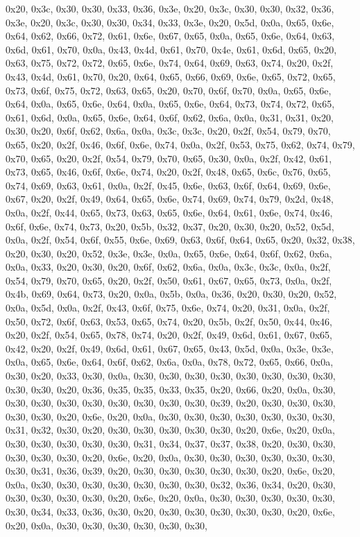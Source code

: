\documentclass[
]{book}
\begin{document}
0x20, 0x3c, 0x30, 0x30, 0x33, 0x36, 0x3e, 0x20, 0x3c, 0x30, 0x30, 0x32, 0x36, 0x3e, 0x20, 0x3c, 0x30, 0x30, 0x34, 0x33, 0x3e, 0x20, 0x5d, 0x0a, 0x65, 0x6e, 0x64, 0x62, 0x66, 0x72, 0x61, 0x6e, 0x67, 0x65, 0x0a, 0x65, 0x6e, 0x64, 0x63, 0x6d, 0x61, 0x70, 0x0a, 0x43, 0x4d, 0x61, 0x70, 0x4e, 0x61, 0x6d, 0x65, 0x20, 0x63, 0x75, 0x72, 0x72, 0x65, 0x6e, 0x74, 0x64, 0x69, 0x63, 0x74, 0x20, 0x2f, 0x43, 0x4d, 0x61, 0x70, 0x20, 0x64, 0x65, 0x66, 0x69, 0x6e, 0x65, 0x72, 0x65, 0x73, 0x6f, 0x75, 0x72, 0x63, 0x65,
0x20, 0x70, 0x6f, 0x70, 0x0a, 0x65, 0x6e, 0x64, 0x0a, 0x65, 0x6e, 0x64, 0x0a, 0x65, 0x6e, 0x64, 0x73, 0x74, 0x72, 0x65, 0x61, 0x6d, 0x0a, 0x65, 0x6e, 0x64, 0x6f, 0x62, 0x6a, 0x0a, 0x31, 0x31, 0x20, 0x30, 0x20, 0x6f, 0x62, 0x6a, 0x0a, 0x3c, 0x3c, 0x20, 0x2f, 0x54, 0x79, 0x70, 0x65, 0x20, 0x2f, 0x46, 0x6f, 0x6e, 0x74, 0x0a, 0x2f, 0x53, 0x75, 0x62, 0x74, 0x79, 0x70, 0x65, 0x20, 0x2f, 0x54, 0x79, 0x70, 0x65, 0x30, 0x0a, 0x2f, 0x42, 0x61, 0x73, 0x65, 0x46, 0x6f, 0x6e, 0x74, 0x20, 0x2f, 0x48, 0x65, 0x6c,
0x76, 0x65, 0x74, 0x69, 0x63, 0x61, 0x0a, 0x2f, 0x45, 0x6e, 0x63, 0x6f, 0x64, 0x69, 0x6e, 0x67, 0x20, 0x2f, 0x49, 0x64, 0x65, 0x6e, 0x74, 0x69, 0x74, 0x79, 0x2d, 0x48, 0x0a, 0x2f, 0x44, 0x65, 0x73, 0x63, 0x65, 0x6e, 0x64, 0x61, 0x6e, 0x74, 0x46, 0x6f, 0x6e, 0x74, 0x73, 0x20, 0x5b, 0x32, 0x37, 0x20, 0x30, 0x20, 0x52, 0x5d, 0x0a, 0x2f, 0x54, 0x6f, 0x55, 0x6e, 0x69, 0x63, 0x6f, 0x64, 0x65, 0x20, 0x32, 0x38, 0x20, 0x30, 0x20, 0x52, 0x3e, 0x3e, 0x0a, 0x65, 0x6e, 0x64, 0x6f, 0x62, 0x6a, 0x0a, 0x33, 0x20,
0x30, 0x20, 0x6f, 0x62, 0x6a, 0x0a, 0x3c, 0x3c, 0x0a, 0x2f, 0x54, 0x79, 0x70, 0x65, 0x20, 0x2f, 0x50, 0x61, 0x67, 0x65, 0x73, 0x0a, 0x2f, 0x4b, 0x69, 0x64, 0x73, 0x20, 0x0a, 0x5b, 0x0a, 0x36, 0x20, 0x30, 0x20, 0x52, 0x0a, 0x5d, 0x0a, 0x2f, 0x43, 0x6f, 0x75, 0x6e, 0x74, 0x20, 0x31, 0x0a, 0x2f, 0x50, 0x72, 0x6f, 0x63, 0x53, 0x65, 0x74, 0x20, 0x5b, 0x2f, 0x50, 0x44, 0x46, 0x20, 0x2f, 0x54, 0x65, 0x78, 0x74, 0x20, 0x2f, 0x49, 0x6d, 0x61, 0x67, 0x65, 0x42, 0x20, 0x2f, 0x49, 0x6d, 0x61, 0x67, 0x65, 0x43,
0x5d, 0x0a, 0x3e, 0x3e, 0x0a, 0x65, 0x6e, 0x64, 0x6f, 0x62, 0x6a, 0x0a, 0x78, 0x72, 0x65, 0x66, 0x0a, 0x30, 0x20, 0x33, 0x30, 0x0a, 0x30, 0x30, 0x30, 0x30, 0x30, 0x30, 0x30, 0x30, 0x30, 0x30, 0x20, 0x36, 0x35, 0x35, 0x33, 0x35, 0x20, 0x66, 0x20, 0x0a, 0x30, 0x30, 0x30, 0x30, 0x30, 0x30, 0x30, 0x30, 0x30, 0x39, 0x20, 0x30, 0x30, 0x30, 0x30, 0x30, 0x20, 0x6e, 0x20, 0x0a, 0x30, 0x30, 0x30, 0x30, 0x30, 0x30, 0x30, 0x31, 0x32, 0x30, 0x20, 0x30, 0x30, 0x30, 0x30, 0x30, 0x20, 0x6e, 0x20, 0x0a, 0x30, 0x30,
0x30, 0x30, 0x30, 0x31, 0x34, 0x37, 0x37, 0x38, 0x20, 0x30, 0x30, 0x30, 0x30, 0x30, 0x20, 0x6e, 0x20, 0x0a, 0x30, 0x30, 0x30, 0x30, 0x30, 0x30, 0x30, 0x31, 0x36, 0x39, 0x20, 0x30, 0x30, 0x30, 0x30, 0x30, 0x20, 0x6e, 0x20, 0x0a, 0x30, 0x30, 0x30, 0x30, 0x30, 0x30, 0x30, 0x32, 0x36, 0x34, 0x20, 0x30, 0x30, 0x30, 0x30, 0x30, 0x20, 0x6e, 0x20, 0x0a, 0x30, 0x30, 0x30, 0x30, 0x30, 0x30, 0x34, 0x33, 0x36, 0x30, 0x20, 0x30, 0x30, 0x30, 0x30, 0x30, 0x20, 0x6e, 0x20, 0x0a, 0x30, 0x30, 0x30, 0x30, 0x30, 0x30,
\end{document}
